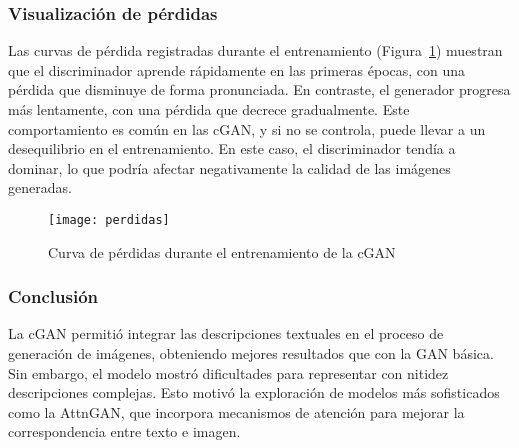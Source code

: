 \subsubsection{Visualización de pérdidas}
Las curvas de pérdida registradas durante el entrenamiento (Figura~\ref{fig:loss_curve_cgan}) muestran que el discriminador aprende rápidamente en las primeras épocas, con una pérdida que disminuye de forma pronunciada. En contraste, el generador progresa más lentamente, con una pérdida que decrece gradualmente. Este comportamiento es común en las cGAN, y si no se controla, puede llevar a un desequilibrio en el entrenamiento. En este caso, el discriminador tendía a dominar, lo que podría afectar negativamente la calidad de las imágenes generadas.

\begin{figure}[H]
\centering
\texttt{[image: perdidas]}
\caption{Curva de pérdidas durante el entrenamiento de la cGAN}
\label{fig:loss_curve_cgan}
\end{figure}

\subsubsection{Conclusión}
La cGAN permitió integrar las descripciones textuales en el proceso de generación de imágenes, obteniendo mejores resultados que con la GAN básica. Sin embargo, el modelo mostró dificultades para representar con nitidez descripciones complejas. Esto motivó la exploración de modelos más sofisticados como la AttnGAN, que incorpora mecanismos de atención para mejorar la correspondencia entre texto e imagen.
